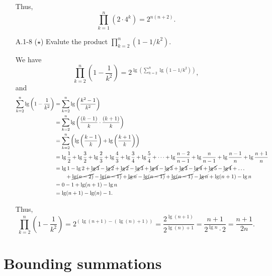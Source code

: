 \begin{enumerate}
\begin{framed}
Thus,
\[
  \prod_{k = 1}^n (2 \cdot 4^k) = 2^{n (n + 2)}.
\]
\end{framed}

\item[A.1{-}8] {($\star$) Evalute the product $\prod_{k = 2}^{n} (1 - 1/k^2)$.}

\begin{framed}
We have
\[
  \prod_{k = 2}^{n} \left(1 - \frac{1}{k^2}\right) = 2^{\lg{\left( \sum_{k = 2}^{n} \lg{(1 - 1/k^2)} \right)}},
\]
and
\begin{equation*}
\begin{aligned}
  \sum_{k = 2}^{n} \lg{\left(1 - \frac{1}{k^2}\right)}
  &= \sum_{k = 2}^{n} \lg{\left( \frac{k^2 - 1}{k^2} \right)}\\
  &= \sum_{k = 2}^{n} \lg{\left( \frac{(k - 1)}{k} \cdot \frac{(k + 1)}{k} \right)}\\
  &= \sum_{k = 2}^{n} \left( \lg \left( \frac{k - 1}{k} \right) + \lg \left( \frac{k + 1}{k} \right) \right)\\
  &= \lg{\frac{1}{2}} + \lg{\frac{3}{2}} +
     \lg{\frac{2}{3}} + \lg{\frac{4}{3}} +
     \lg{\frac{3}{4}} + \lg{\frac{5}{4}} +
     \dots +
     \lg{\frac{n - 2}{n - 1}} + \lg{\frac{n}{n - 1}} +
     \lg{\frac{n - 1}{n}} + \lg{\frac{n + 1}{n}}\\
  &= \lg 1 - \lg 2 + \cancel{\lg 3} - \cancel{\lg 2} + \cancel{\lg 2} - \cancel{\lg 3}
           + \cancel{\lg 4} - \cancel{\lg 3} + \cancel{\lg 3} - \cancel{\lg 4} + \cancel{\lg 5} - \cancel{\lg 4} + \dots\\
  & \qquad + \cancel{\lg (n - 2)} - \cancel{\lg (n - 1)} + \cancel{\lg n} - \cancel{\lg (n - 1)}
           + \cancel{\lg (n - 1)} - \cancel{\lg n} + \lg (n + 1) - \lg n\\
  &= 0 - 1 + \lg (n + 1) - \lg n\\
  &= \lg (n + 1) - \lg (n) - 1.
\end{aligned}
\end{equation*}

Thus,
\[
  \prod_{k = 2}^{n} \left(1 - \frac{1}{k^2}\right) = 2^{(\lg (n + 1) - (\lg (n) + 1))}
  = \frac{2^{\lg{(n + 1)}}}{2^{\lg{(n) + 1}}}
  = \frac{n + 1}{2^{\lg n} \cdot 2}
  = \frac{n + 1}{2n}.
\]
\end{framed}

\end{enumerate}

\newpage

\section{Bounding summations}

